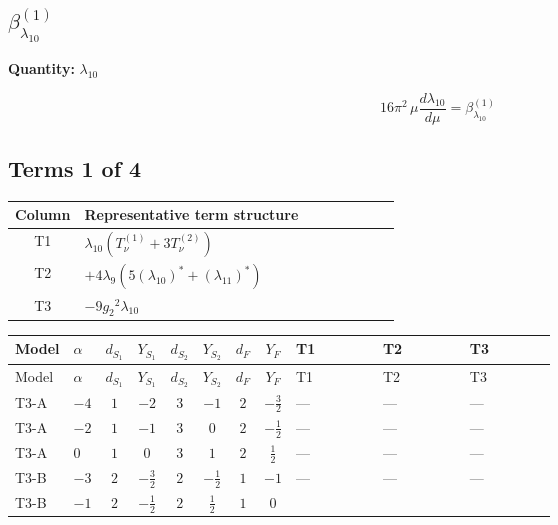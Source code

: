 \documentclass[8pt]{article}
\begin{document}
\begin{landscape}
\section*{$\beta_{\lambda_{10}}^{(1)}$}
\noindent\textbf{Quantity: }$\lambda_{10}$\par\smallskip
\[16\pi^2\,\mu\frac{d \lambda_{10}}{d\mu}=\beta_{\lambda_{10}}^{(1)}\]
\subsection*{Terms 1 of 4}
\begin{center}
\begin{tabular}{@{}c >{\raggedright\arraybackslash}p{0.82\linewidth}@{}}
\toprule
Column & Representative term structure \\
\midrule
T1 & \(\displaystyle {\lambda_{10}} (T_{\nu}^{(1)}+3 T_{\nu}^{(2)})\) \\
\midrule
T2 & \(\displaystyle +4 {\lambda_{9}} (5 \left({\lambda_{10}}\right)^{*}+\left({\lambda_{11}}\right)^{*})\) \\
\midrule
T3 & \(\displaystyle -9 {g_2}^2 {\lambda_{10}}\) \\
\midrule
\bottomrule
\end{tabular}
\end{center}
\smallskip
\tiny
\begin{longtable}{@{}llcccccc >{\raggedright\arraybackslash}p{0.21\linewidth} >{\raggedright\arraybackslash}p{0.21\linewidth} >{\raggedright\arraybackslash}p{0.21\linewidth}@{}}
\toprule
Model & $\alpha$ & $d_{S_1}$ & $Y_{S_1}$ & $d_{S_2}$ & $Y_{S_2}$ & $d_F$ & $Y_F$ & T1 & T2 & T3 \\
\midrule
\endfirsthead
\toprule
Model & $\alpha$ & $d_{S_1}$ & $Y_{S_1}$ & $d_{S_2}$ & $Y_{S_2}$ & $d_F$ & $Y_F$ & T1 & T2 & T3 \\
\midrule
\endhead
T3-A & $-4$ & $1$ & $-2$ & $3$ & $-1$ & $2$ & $-\frac{3}{2}$ & --- & --- & --- \\
\midrule
T3-A & $-2$ & $1$ & $-1$ & $3$ & $0$ & $2$ & $-\frac{1}{2}$ & --- & --- & --- \\
\midrule
T3-A & $0$ & $1$ & $0$ & $3$ & $1$ & $2$ & $\frac{1}{2}$ & --- & --- & --- \\
\midrule
T3-B & $-3$ & $2$ & $-\frac{3}{2}$ & $2$ & $-\frac{1}{2}$ & $1$ & $-1$ & --- & --- & --- \\
\midrule
T3-B & $-1$ & $2$ & $-\frac{1}{2}$ & $2$ & $\frac{1}{2}$ & $1$ & $0$ & \scriptsize\adjustbox{max width=\linewidth}{$\begin{gathered} {\lambda_{10}} (T_{\nu}^{(1)}+3 T_{\nu}^{(2)})\end{gathered}$} & \scriptsize\adjustbox{max width=\linewidth}{$\begin{gathered} +4 {\lambda_{9}} (5 \left({\lambda_{10}}\right)^{*}+\left({\lambda_{11}}\right)^{*})\end{gathered}$} & \scriptsize\adjustbox{max width=\linewidth}{$\begin{gathered} -9 {g_2}^2 {\lambda_{10}}\end{gathered}$} \\

\end{longtable}
\end{landscape}
\end{document}
